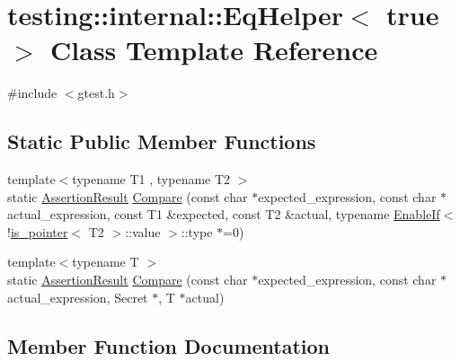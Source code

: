 \hypertarget{classtesting_1_1internal_1_1_eq_helper_3_01true_01_4}{}\section{testing\+:\+:internal\+:\+:Eq\+Helper$<$ true $>$ Class Template Reference}
\label{classtesting_1_1internal_1_1_eq_helper_3_01true_01_4}


{\ttfamily \#include $<$gtest.\+h$>$}

\subsection*{Static Public Member Functions}
\begin{DoxyCompactItemize}
\item 
{\footnotesize template$<$typename T1 , typename T2 $>$ }\\static \hyperlink{classtesting_1_1_assertion_result}{Assertion\+Result} \hyperlink{classtesting_1_1internal_1_1_eq_helper_3_01true_01_4_a43a207030451389f902ed12a35eda97d}{Compare} (const char $\ast$expected\+\_\+expression, const char $\ast$actual\+\_\+expression, const T1 \&expected, const T2 \&actual,               typename \hyperlink{structtesting_1_1internal_1_1_enable_if}{Enable\+If}$<$!\hyperlink{structtesting_1_1internal_1_1is__pointer}{is\+\_\+pointer}$<$ T2 $>$\+::value $>$\+::type $\ast$=0)
\item 
{\footnotesize template$<$typename T $>$ }\\static \hyperlink{classtesting_1_1_assertion_result}{Assertion\+Result} \hyperlink{classtesting_1_1internal_1_1_eq_helper_3_01true_01_4_a0be110f9570165cfd7544228fae50b49}{Compare} (const char $\ast$expected\+\_\+expression, const char $\ast$actual\+\_\+expression,                   Secret $\ast$, T $\ast$actual)
\end{DoxyCompactItemize}


\subsection{Member Function Documentation}
\hypertarget{classtesting_1_1internal_1_1_eq_helper_3_01true_01_4_a43a207030451389f902ed12a35eda97d}{}
